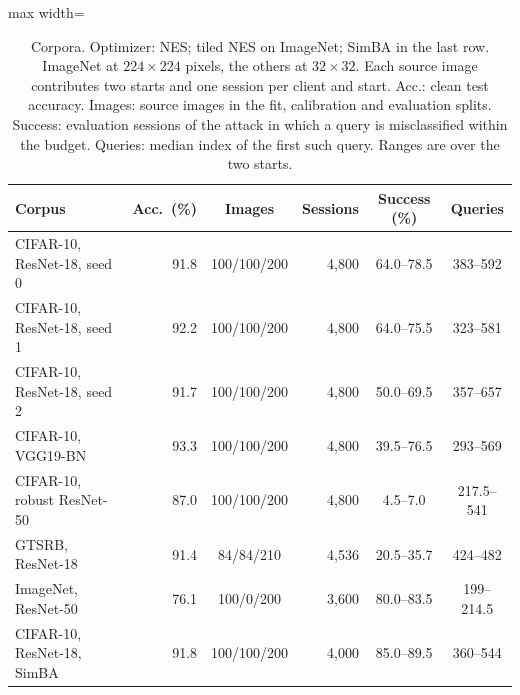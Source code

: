 \begin{table}[!tbp]
\centering\footnotesize\setlength{\tabcolsep}{4pt}
\caption{Corpora. Optimizer: NES; tiled NES on ImageNet; SimBA in the last row. ImageNet at $224\times224$ pixels, the others at $32\times32$. Each source image contributes two starts and one session per client and start. Acc.: clean test accuracy. Images: source images in the fit, calibration and evaluation splits. Success: evaluation sessions of the attack in which a query is misclassified within the budget. Queries: median index of the first such query. Ranges are over the two starts.}
\label{tab:corpora}
\vspace{3pt}
\begin{adjustbox}{max width=\textwidth}
\begin{tabular}{lrcrcc}
\toprule
Corpus & Acc.\ (\%) & Images & Sessions & Success (\%) & Queries \\
\midrule
CIFAR-10, ResNet-18, seed 0 & 91.8 & 100/100/200 & 4{,}800 & 64.0--78.5 & 383--592 \\
CIFAR-10, ResNet-18, seed 1 & 92.2 & 100/100/200 & 4{,}800 & 64.0--75.5 & 323--581 \\
CIFAR-10, ResNet-18, seed 2 & 91.7 & 100/100/200 & 4{,}800 & 50.0--69.5 & 357--657 \\
CIFAR-10, VGG19-BN & 93.3 & 100/100/200 & 4{,}800 & 39.5--76.5 & 293--569 \\
CIFAR-10, robust ResNet-50 & 87.0 & 100/100/200 & 4{,}800 & 4.5--7.0 & 217.5--541 \\
GTSRB, ResNet-18 & 91.4 & 84/84/210 & 4{,}536 & 20.5--35.7 & 424--482 \\
ImageNet, ResNet-50 & 76.1 & 100/0/200 & 3{,}600 & 80.0--83.5 & 199--214.5 \\
CIFAR-10, ResNet-18, SimBA & 91.8 & 100/100/200 & 4{,}000 & 85.0--89.5 & 360--544 \\
\bottomrule
\end{tabular}
\end{adjustbox}
\end{table}
